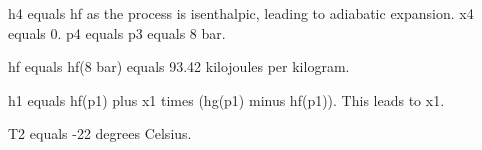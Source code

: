 h4 equals hf as the process is isenthalpic, leading to adiabatic expansion.  
x4 equals 0.  
p4 equals p3 equals 8 bar.  

hf equals hf(8 bar) equals 93.42 kilojoules per kilogram.  

h1 equals hf(p1) plus x1 times (hg(p1) minus hf(p1)).  
This leads to x1.  

T2 equals -22 degrees Celsius.